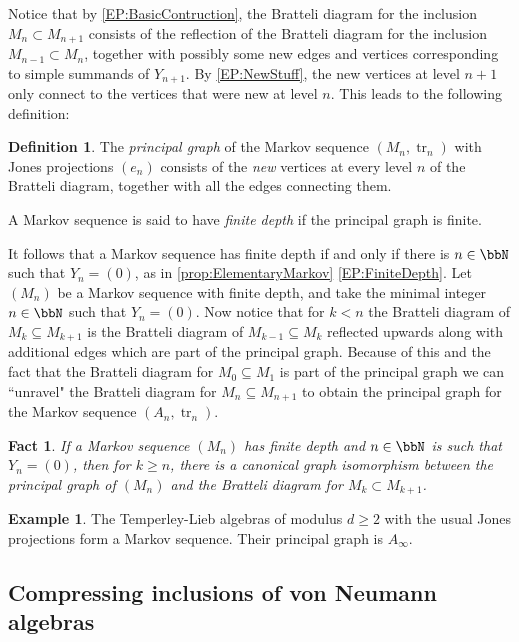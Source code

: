 \documentclass[11pt]{article}
\theoremstyle{plain}
\newtheorem{fact}[thm]{Fact}
\theoremstyle{definition}
\newtheorem{defn}[thm]{Definition}
\newtheorem{ex}[thm]{Example}
\DeclareMathOperator{\tr}{tr}
\begin{document}
Notice that by \eqref{EP:BasicContruction}, the Bratteli diagram for the inclusion $M_{n}\subset M_{n+1}$ consists of the reflection of the Bratteli diagram for the inclusion $M_{n-1} \subset M_n$, together with possibly some new edges and vertices corresponding to simple summands of $Y_{n+1}$. By \eqref{EP:NewStuff}, the new vertices at level $n+1$ only connect to the vertices that were new at level $n$. This leads to the following definition:


\begin{defn}
The \emph{principal graph} of the Markov sequence $(M_n,\tr_n)$ with Jones projections $(e_n)$ consists of the \emph{new} vertices at every level $n$ of the Bratteli diagram, together with all the edges connecting them.

A Markov sequence is said to have \emph{finite depth} if the principal graph is finite.
\end{defn}


It follows that a Markov sequence has finite depth if and only if there is $n\in \bbN$ such that $Y_n = (0)$, as in \ref{prop:ElementaryMarkov} \eqref{EP:FiniteDepth}. Let $(M_n)$ be a Markov sequence with finite depth, and take the minimal integer $n\in \bbN$ such that $Y_n=(0)$. Now notice that for $k<n$ the Bratteli diagram of $M_k\subseteq M_{k+1}$ is the Bratteli diagram of $M_{k-1}\subseteq M_{k}$ reflected upwards along with additional edges which are part of the principal graph. Because of this and the fact that the Bratteli diagram for $M_0\subseteq M_1$ is part of the principal graph we can ``unravel" the Bratteli diagram for $M_{n}\subseteq M_{n+1}$ to obtain the principal graph for the Markov sequence $(A_n,\tr_n)$.

\begin{fact}\label{BratteliPrincipal}
	If a Markov sequence $(M_n)$ has finite depth and $n\in \bbN$ is such that $Y_n=(0)$, then for $k\geq n$, there is a canonical graph isomorphism between the principal graph of $(M_n)$ and the Bratteli diagram for $M_{k}\subset M_{k+1}$.
\end{fact}

\begin{ex}
The Temperley-Lieb algebras of modulus $d\geq 2$ with the usual Jones projections form a Markov sequence. Their principal graph is $A_{\infty}$.
\end{ex}

\subsection{Compressing inclusions of von Neumann algebras} 
\end{document}
